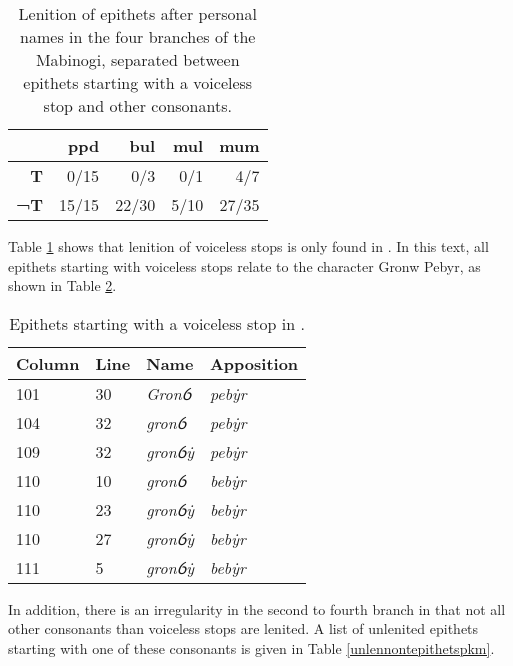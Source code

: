 \begin{table}[h]
  \centering
    \begin{tabular}{rrrrr}
    \toprule
    \textbf{} & \textbf{\acrshort{ppd}} & \textbf{\acrshort{bul}} & \textbf{\acrshort{mul}} & \textbf{\acrshort{mum}} \\
    \midrule
    \textbf{T} & 0/15 & 0/3 & 0/1 & 4/7 \\
    \textbf{¬T} & 15/15 & 22/30 & 5/10 & 27/35 \\
    \bottomrule
    \end{tabular}%
    \caption{Lenition of epithets after personal names in the four branches of the Mabinogi, separated between epithets starting with a voiceless stop and other consonants.}
  \label{lenitionepithetspkm}%
\end{table}%
 Table \ref{lenitionepithetspkm} shows that lenition of voiceless stops is only found in . In this text, all epithets starting with voiceless stops relate to the character Gronw Pebyr, as shown in Table \ref{gronwpebyr}.
 \begin{table}[h]
\centering
\begin{tabular}{@{}llll@{}}
\toprule
\textbf{Column} & \textbf{Line} & \textbf{Name}   & \textbf{Apposition} \\ \midrule
101             & 30            & \textit{Gronỽ}  & \textit{pebẏr}      \\
104             & 32            & \textit{gronỽ}  & \textit{pebẏr}      \\
109             & 32            & \textit{gronỽẏ} & \textit{pebẏr}      \\
110             & 10            & \textit{gronỽ}  & \textit{bebẏr}      \\
110             & 23            & \textit{gronỽẏ} & \textit{bebẏr}      \\
110             & 27            & \textit{gronỽẏ} & \textit{bebẏr}      \\
111             & 5             & \textit{gronỽẏ} & \textit{bebẏr}      \\ \bottomrule
\end{tabular}
\caption{Epithets starting with a voiceless stop in .}
\label{gronwpebyr}
\end{table}

In addition, there is an irregularity in the second to fourth branch in that not all other consonants than voiceless stops are lenited. A list of unlenited epithets starting with one of these consonants is given in Table \ref{unlennontepithetspkm}.

